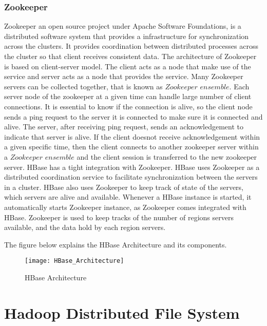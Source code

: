 \documentclass[11pt,a4paper,bibtotoc,idxtotoc,headsepline,footsepline,footexclude,BCOR12mm,DIV13]{scrbook}
\begin{document}
\subsubsection{Zookeeper}
\label{zookeeper}
Zookeeper an open source project under Apache Software Foundations, is a distributed software system that provides a infrastructure for synchronization across the clusters. It provides coordination between distributed processes across the cluster so that client receives consistent data. The architecture of Zookeeper is based on client-server model. The client acts as a node that make use of the service and server acts as a node that provides the service\cite{hbase:zookeeper}. Many Zookeeper servers can be collected together, that is known as $Zookeeper$ $ensemble$\cite{hbase:zookeeper}. Each server node of the zookeeper at a given time can handle large number of client connections. It is essential to know if the connection is alive, so the client node sends a ping request to the server it is connected to make sure it is connected and alive\cite{hbase:zookeeper}. The server, after receiving ping request, sends an acknowledgement to indicate that server is alive. If the client doesnot receive acknowledgement within a given specific time, then the client connects to another zookeeper server within a $Zookeeper$ $ensemble$ and the client session is transferred to the new zookeeper server\cite{hbase:zookeeper}.
\newline
HBase has a tight integration with Zookeeper. HBase uses Zookeeper as a distributed coordination service to facilitate synchronization between the servers in a cluster. HBase also uses Zookeeper to keep track of state of the servers, which servers are alive and available\cite{hbase:architecture}. Whenever a HBase instance is started, it automatically starts Zookeeper instance, as Zookeeper comes integrated with HBase\cite{hbase:insights}. Zookeeper is used to keep tracks of the number of regions servers available, and the data hold by each region servers. 
\newline

The figure below explains the HBase Architecture and its components.
\begin{figure}
	\centering
	\texttt{[image: HBase\_Architecture]}
	\caption{HBase Architecture}
	\label{fig:hbasetable}
\end{figure}

\newpage
\section{Hadoop Distributed File System}
\label{Hadoop Distributed File System}
\end{document}
